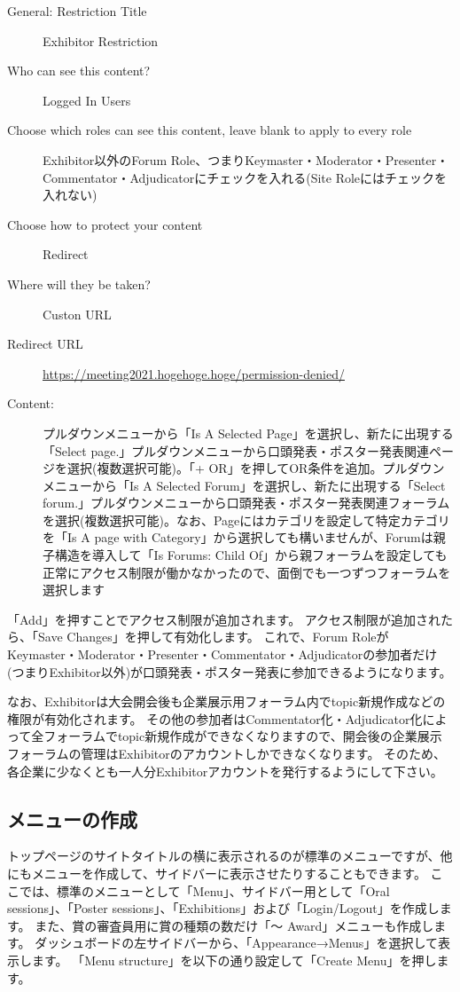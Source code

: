 \documentclass[titlepage,10pt,a4paper,uplatex]{jsbook}
\begin{document}
\begin{description}
\item[General: Restriction Title] Exhibitor Restriction
\item[Who can see this content?] Logged In Users
\item[Choose which roles can see this content, leave blank to apply to every role] Exhibitor以外のForum Role、つまりKeymaster・Moderator・Presenter・Commentator・Adjudicatorにチェックを入れる(Site Roleにはチェックを入れない)
\item[Choose how to protect your content] Redirect
\item[Where will they be taken?] Custon URL
\item[Redirect URL] \url{https://meeting2021.hogehoge.hoge/permission-denied/}
\item[Content: ] プルダウンメニューから「Is A Selected Page」を選択し、新たに出現する「Select page.」プルダウンメニューから口頭発表・ポスター発表関連ページを選択(複数選択可能)。「+ OR」を押してOR条件を追加。プルダウンメニューから「Is A Selected Forum」を選択し、新たに出現する「Select forum.」プルダウンメニューから口頭発表・ポスター発表関連フォーラムを選択(複数選択可能)。なお、Pageにはカテゴリを設定して特定カテゴリを「Is A page with Category」から選択しても構いませんが、Forumは親子構造を導入して「Is Forums: Child Of」から親フォーラムを設定しても正常にアクセス制限が働かなかったので、面倒でも一つずつフォーラムを選択します
\end{description}

「Add」を押すことでアクセス制限が追加されます。
アクセス制限が追加されたら、「Save Changes」を押して有効化します。
これで、Forum RoleがKeymaster・Moderator・Presenter・Commentator・Adjudicatorの参加者だけ(つまりExhibitor以外)が口頭発表・ポスター発表に参加できるようになります。

なお、Exhibitorは大会開会後も企業展示用フォーラム内でtopic新規作成などの権限が有効化されます。
その他の参加者はCommentator化・Adjudicator化によって全フォーラムでtopic新規作成ができなくなりますので、開会後の企業展示フォーラムの管理はExhibitorのアカウントしかできなくなります。
そのため、各企業に少なくとも一人分Exhibitorアカウントを発行するようにして下さい。

\subsection{メニューの作成}

トップページのサイトタイトルの横に表示されるのが標準のメニューですが、他にもメニューを作成して、サイドバーに表示させたりすることもできます。
ここでは、標準のメニューとして「Menu」、サイドバー用として「Oral sessions」、「Poster sessions」、「Exhibitions」および「Login/Logout」を作成します。
また、賞の審査員用に賞の種類の数だけ「～ Award」メニューも作成します。
ダッシュボードの左サイドバーから、「Appearance→Menus」を選択して表示します。
「Menu structure」を以下の通り設定して「Create Menu」を押します。
\end{document}
